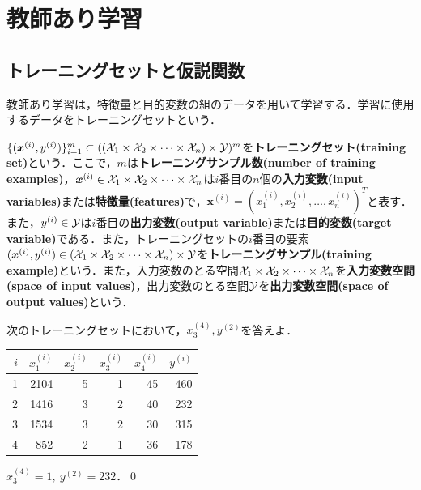 \chapter{教師あり学習}

\section{トレーニングセットと仮説関数}

教師あり学習は，特徴量と目的変数の組のデータを用いて学習する．学習に使用するデータをトレーニングセットという．

\begin{defi}[トレーニングセット]
$\{(\bm{x}^{(i)},y^{(i)})\}_{i=1}^m \subset (({\cal X}_1 \times {\cal X}_2\times \cdots \times{\cal X}_n) \times {\cal Y})^m$を{\bf トレーニングセット(training set)}という．ここで，$m$は{\bf トレーニングサンプル数(number of training examples)}，${\bm x}^{(i)} \in {\cal X}_1 \times {\cal X}_2\times \cdots \times {\cal X}_n$は$i$番目の$n$個の{\bf 入力変数(input variables)}または{\bf 特徴量(features)}で，${\bm x}^{(i)}=(x_1^{(i)},x_2^{(i)},\ldots,x_n^{(i)})^T$と表す．また，$y^{(i)} \in {\cal Y}$は$i$番目の{\bf 出力変数(output variable)}または{\bf 目的変数(target variable)}である．また，トレーニングセットの$i$番目の要素$({\bm x}^{(i)},y^{(i)})\in ({\cal X}_1 \times {\cal X}_2\times \cdots \times{\cal X}_n) \times {\cal Y}$を{\bf トレーニングサンプル(training example)}という．また，入力変数のとる空間${\cal X}_1 \times {\cal X}_2\times \cdots \times{\cal X}_n$を{\bf 入力変数空間(space of input values)}，出力変数のとる空間${\cal Y}$を{\bf 出力変数空間(space of output values)}という．
\end{defi}

\begin{qu}
次のトレーニングセットにおいて，$x_3^{(4)},y^{(2)}$を答えよ．
\begin{table}[H]
\centering
\begin{tabular}{rrrrrr}
\hline
$i$ &$x_1^{(i)}$ &$x_2^{(i)}$ &$x_3^{(i)}$ &$x_4^{(i)}$ & $y^{(i)}$ \\ \hline
1 & 2104 & 5 & 1 & 45 & 460 \\
2 & 1416 & 3 & 2 & 40 & 232 \\
3 & 1534 & 3 & 2 & 30 & 315 \\
4 & 852  & 2 & 1 & 36 & 178 \\ \hline
\end{tabular}
\end{table}
\end{qu}
\begin{ans}
$x_3^{(4)}=1,~y^{(2)}=232$．\qed
\end{ans}

